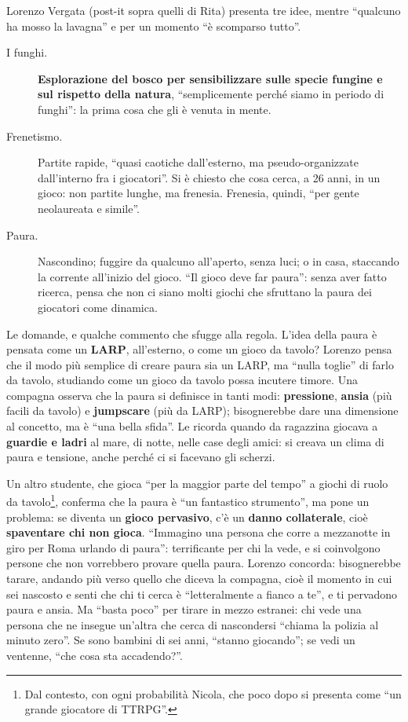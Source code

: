 Lorenzo Vergata (post-it sopra quelli di Rita) presenta tre idee, mentre ``qualcuno
ha mosso la lavagna'' e per un momento ``è scomparso tutto''.
\begin{description}
  \item[I funghi.] \textbf{Esplorazione del bosco per sensibilizzare sulle specie
        fungine e sul rispetto della natura}, ``semplicemente perché siamo in periodo
        di funghi'': la prima cosa che gli è venuta in mente.
  \item[Frenetismo.] Partite rapide, ``quasi caotiche dall'esterno, ma
        pseudo-organizzate dall'interno fra i giocatori''. Si è chiesto che cosa cerca,
        a 26 anni, in un gioco: non partite lunghe, ma frenesia. Frenesia, quindi,
        ``per gente neolaureata e simile''.
  \item[Paura.] Nascondino; fuggire da qualcuno all'aperto, senza luci; o in casa,
        staccando la corrente all'inizio del gioco. ``Il gioco deve far paura'':
        senza aver fatto ricerca, pensa che non ci siano molti giochi che sfruttano la
        paura dei giocatori come dinamica.
\end{description}
Le domande, e qualche commento che sfugge alla regola. L'idea della paura è pensata
come un \textbf{LARP}, all'esterno, o come un gioco da tavolo? Lorenzo pensa che il
modo più semplice di creare paura sia un LARP, ma ``nulla toglie'' di farlo da tavolo,
studiando come un gioco da tavolo possa incutere timore. Una compagna osserva che la
paura si definisce in tanti modi: \textbf{pressione}, \textbf{ansia} (più facili da
tavolo) e \textbf{jumpscare} (più da LARP); bisognerebbe dare una dimensione al
concetto, ma è ``una bella sfida''. Le ricorda quando da ragazzina giocava a
\textbf{guardie e ladri} al mare, di notte, nelle case degli amici: si creava un
clima di paura e tensione, anche perché ci si facevano gli scherzi.

Un altro studente, che gioca ``per la maggior parte del tempo'' a giochi di ruolo da
tavolo\footnote{Dal contesto, con ogni probabilità Nicola, che poco dopo si presenta
come ``un grande giocatore di TTRPG''.}, conferma che la paura è ``un fantastico
strumento'', ma pone un problema: se diventa un \textbf{gioco pervasivo}, c'è un
\textbf{danno collaterale}, cioè \textbf{spaventare chi non gioca}. ``Immagino una
persona che corre a mezzanotte in giro per Roma urlando di paura'': terrificante per
chi la vede, e si coinvolgono persone che non vorrebbero provare quella paura.
Lorenzo concorda: bisognerebbe tarare, andando più verso quello che diceva la
compagna, cioè il momento in cui sei nascosto e senti che chi ti cerca è ``letteralmente
a fianco a te'', e ti pervadono paura e ansia. Ma ``basta poco'' per tirare in mezzo
estranei: chi vede una persona che ne insegue un'altra che cerca di nascondersi
``chiama la polizia al minuto zero''. Se sono bambini di sei anni, ``stanno
giocando''; se vedi un ventenne, ``che cosa sta accadendo?''.

